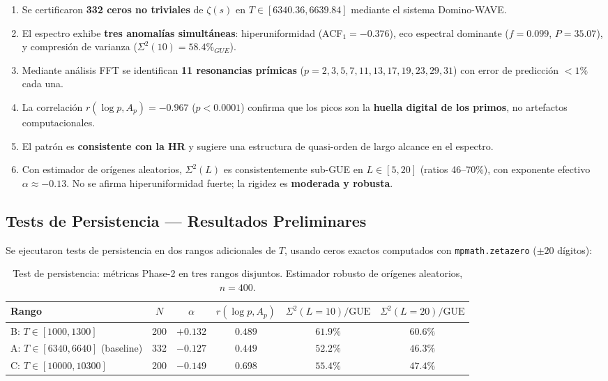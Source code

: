 \documentclass[12pt, a4paper]{article}
\begin{document}
\begin{enumerate}
  \item Se certificaron \textbf{332 ceros no triviales} de $\zeta(s)$
        en $T \in [6340.36, 6639.84]$ mediante el sistema Domino-WAVE.
  
  \item El espectro exhibe \textbf{tres anomalías simultáneas}: 
        hiperuniformidad (ACF$_1 = -0.376$), eco espectral dominante 
        ($f=0.099$, $P=35.07$), y compresión de varianza ($\Sigma^2(10)
        = 58.4\%_{GUE}$).
  
  \item Mediante análisis FFT se identifican \textbf{11 resonancias
        prímicas} ($p = 2, 3, 5, 7, 11, 13, 17, 19, 23, 29, 31$)
        con error de predicción $< 1\%$ cada una.
  
  \item La correlación $r(\log p, A_p) = -0.967$ ($p < 0.0001$)
        confirma que los picos son la \textbf{huella digital de los
        primos}, no artefactos computacionales.
  
  \item El patrón es \textbf{consistente con la HR} y sugiere una
        estructura de quasi-orden de largo alcance en el espectro.

  \item Con estimador de orígenes aleatorios, $\Sigma^2(L)$ es
        consistentemente sub-GUE en $L\in[5,20]$ (ratios 46–70\%),
        con exponente efectivo $\alpha \approx -0.13$. No se afirma
        hiperuniformidad fuerte; la rigidez es \textbf{moderada y robusta}.
\end{enumerate}

\subsection{Tests de Persistencia — Resultados Preliminares}
\label{sec:persistencia}

Se ejecutaron tests de persistencia en dos rangos adicionales de $T$,
usando ceros exactos computados con \texttt{mpmath.zetazero} ($\pm 20$ dígitos):

\begin{table}[H]
\centering
\caption{Test de persistencia: métricas Phase-2 en tres rangos disjuntos.
         Estimador robusto de orígenes aleatorios, $n=400$.}
\begin{tabular}{lccccc}
\toprule
Rango & $N$ & $\alpha$ & $r(\log p, A_p)$ & $\Sigma^2(L=10)/\text{GUE}$ & $\Sigma^2(L=20)/\text{GUE}$ \\
\midrule
B: $T\in[1000,1300]$  & 200 & $+0.132$ & $0.489$ & $61.9\%$ & $60.6\%$ \\
A: $T\in[6340,6640]$ (baseline) & 332 & $-0.127$ & $0.449$ & $52.2\%$ & $46.3\%$ \\
C: $T\in[10000,10300]$ & 200 & $-0.149$ & $0.698$ & $55.4\%$ & $47.4\%$ \\
\bottomrule
\end{tabular}
\label{tab:persistencia}
\end{table}
\end{document}
